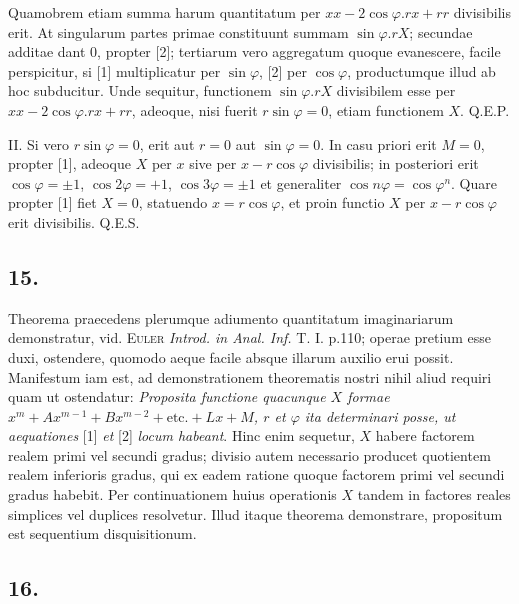 \documentclass[14pt]{memoir}
\theoremstyle{plain}
\theoremstyle{remark}
\begin{document}
Quamobrem etiam summa harum quantitatum per \(xx-2\cos\varphi.rx+rr\) divisibilis erit. At singularum partes primae constituunt summam \(\sin\varphi.rX\); secundae additae dant \(0\), propter [2]; tertiarum vero aggregatum quoque evanescere, facile perspicitur, si [1] multiplicatur per \(\sin \varphi\), [2] per \(\cos \varphi\), productumque illud ab hoc subducitur. Unde sequitur, functionem \(\sin \varphi . r X\) divisibilem esse per \(xx - 2 \cos \varphi .rx +rr\), adeoque, nisi fuerit \(r \sin \varphi = 0\), etiam functionem \(X\).  Q.E.P.

II. Si vero \(r \sin \varphi = 0\), erit aut \(r = 0\) aut \(\sin \varphi = 0\). In casu priori erit \(M=0\), propter [1], adeoque \(X\) per \(x\) sive per \(x - r\cos\varphi\) divisibilis; in posteriori erit \(\cos \varphi = \pm 1\), \(\cos 2 \varphi = +1\), \(\cos 3 \varphi = \pm 1\) et generaliter \(\cos n\varphi = \cos \varphi^n\). Quare propter [1] fiet \(X=0\), statuendo \(x=r \cos \varphi\), et proin functio \(X\) per \(x-r\cos\varphi\) erit divisibilis.   Q.E.S.

\subsection*{15.}

Theorema praecedens plerumque adiumento quantitatum imaginariarum demonstratur, vid. \textsc{Euler} \textit{Introd. in Anal. Inf. }T. I. p.110; operae pretium esse duxi, ostendere, quomodo aeque facile absque illarum auxilio erui possit. Manifestum iam est, ad demonstrationem theorematis nostri nihil aliud requiri quam ut ostendatur: \textit{Proposita functione quacunque \(X\) formae \( x^m + Ax^{m-1}+Bx^{m-2}+\text{etc.} +Lx + M\), \(r\)  et \(\varphi\) ita determinari posse, ut aequationes} [1] \textit{et} [2] \textit{locum habeant}. Hinc enim sequetur, \(X\) habere factorem realem primi vel secundi gradus; divisio autem necessario producet quotientem realem inferioris gradus, qui ex eadem ratione quoque factorem primi vel secundi gradus habebit. Per continuationem huius operationis \(X\) tandem in factores reales simplices vel duplices resolvetur. Illud itaque theorema demonstrare, propositum est sequentium disquisitionum.

\subsection*{16.}
\end{document}
